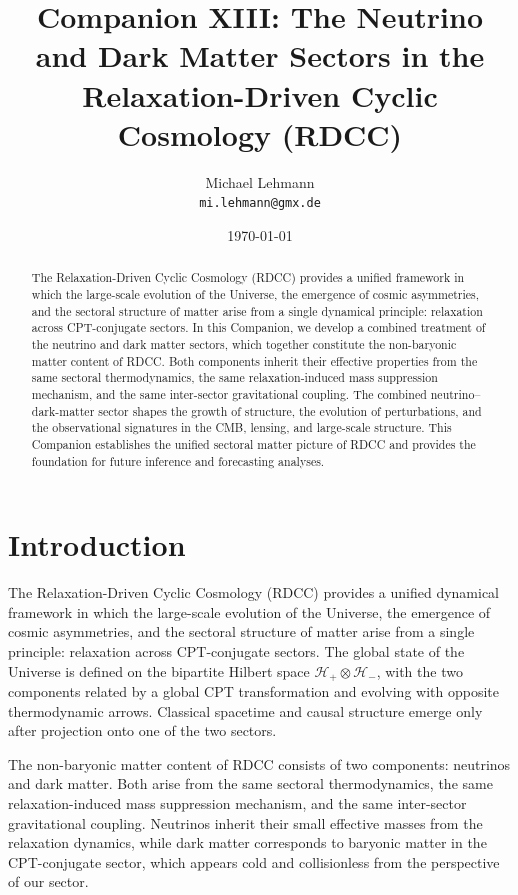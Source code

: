 \documentclass[11pt,a4paper]{article}
\title{\textbf{Companion XIII: The Neutrino and Dark Matter Sectors in the Relaxation-Driven Cyclic Cosmology (RDCC)}}
\author[1]{Michael Lehmann \\ \texttt{mi.lehmann@gmx.de}}
\affil[1]{\small Independent Researcher, Relaxation-Driven Cyclic Cosmology (RDCC) Framework}
\date{\small \today}
\newcommand{\Hglobal}{\mathcal{H}_{+}\!\otimes\!\mathcal{H}_{-}}
\begin{document}
\maketitle

\begin{abstract}
The Relaxation-Driven Cyclic Cosmology (RDCC) provides a unified framework in which the large-scale evolution of the Universe, the emergence of cosmic asymmetries, and the sectoral structure of matter arise from a single dynamical principle: relaxation across CPT-conjugate sectors. In this Companion, we develop a combined treatment of the neutrino and dark matter sectors, which together constitute the non-baryonic matter content of RDCC. Both components inherit their effective properties from the same sectoral thermodynamics, the same relaxation-induced mass suppression mechanism, and the same inter-sector gravitational coupling. The combined neutrino–dark-matter sector shapes the growth of structure, the evolution of perturbations, and the observational signatures in the CMB, lensing, and large-scale structure. This Companion establishes the unified sectoral matter picture of RDCC and provides the foundation for future inference and forecasting analyses.
\end{abstract}


\section{Introduction}

The Relaxation-Driven Cyclic Cosmology (RDCC) provides a unified dynamical
framework in which the large-scale evolution of the Universe, the emergence of
cosmic asymmetries, and the sectoral structure of matter arise from a single
principle: relaxation across CPT-conjugate sectors. The global state of the
Universe is defined on the bipartite Hilbert space $\Hglobal$, with the two
components related by a global CPT transformation and evolving with opposite
thermodynamic arrows. Classical spacetime and causal structure emerge only
after projection onto one of the two sectors.

The non-baryonic matter content of RDCC consists of two components: neutrinos
and dark matter. Both arise from the same sectoral thermodynamics, the same
relaxation-induced mass suppression mechanism, and the same inter-sector
gravitational coupling. Neutrinos inherit their small effective masses from the
relaxation dynamics, while dark matter corresponds to baryonic matter in the
CPT-conjugate sector, which appears cold and collisionless from the perspective
of our sector.
\end{document}
